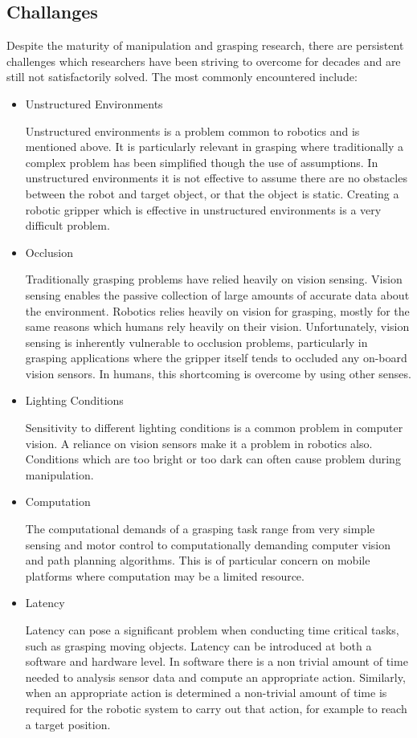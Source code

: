 \subsection{Challanges}

Despite the maturity of manipulation and grasping research, there are persistent challenges which researchers have been striving to overcome for decades and are still not satisfactorily solved. The most commonly encountered include:
\begin{itemize}
    \item Unstructured Environments \cite{Delft, Zhao}
    
    Unstructured environments is a problem common to robotics and is mentioned above. It is particularly relevant in grasping where traditionally a complex problem has been simplified though the use of assumptions. In unstructured environments it is not effective to assume there are no obstacles between the robot and target object, or that the object is static. Creating a robotic gripper which is effective in unstructured environments is a very difficult problem.
    \item Occlusion \cite{Delft, Detectionandmapping, Zhao}
    
    Traditionally grasping problems have relied heavily on vision sensing. Vision sensing enables the passive collection of large amounts of accurate data about the environment. Robotics relies heavily on vision for grasping, mostly for the same reasons which humans rely heavily on their vision. Unfortunately, vision sensing is inherently vulnerable to occlusion problems, particularly in grasping applications where the gripper itself tends to occluded any on-board vision sensors. In humans, this shortcoming is overcome by using other senses.
    \item Lighting Conditions \cite{Delft, Detectionandmapping}
    
    Sensitivity to different lighting conditions is a common problem in computer vision. A reliance on vision sensors make it a problem in robotics also. Conditions which are too bright or too dark can often cause problem during manipulation.
    \item Computation
    
    The computational demands of a grasping task range from very simple sensing and motor control to computationally demanding computer vision and path planning algorithms. This is of particular concern on mobile platforms where computation may be a limited resource.
    \item Latency
    
    Latency can pose a significant problem when conducting time critical tasks, such as grasping moving objects. Latency can be introduced at both a software and hardware level. In software there is a non trivial amount of time needed to analysis sensor data and compute an appropriate action. Similarly, when an appropriate action is determined a non-trivial amount of time is required for the robotic system to carry out that action, for example to reach a target position.
    
    
\end{itemize}


